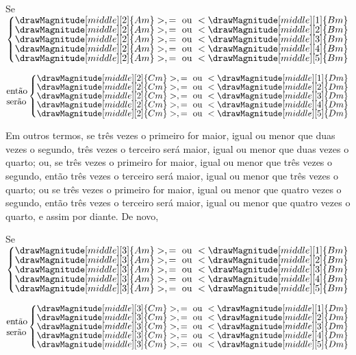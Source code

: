 \documentclass[booklanguage=brazilian]{byrnebook}
\begin{document}
\begin{center}
Se
$\left\{\vcenter{
\nointerlineskip\hbox{$\drawMagnitude[middle][2]{Am} >, = \mbox{ ou } < \drawMagnitude[middle][1]{Bm}$}
\nointerlineskip\hbox{$\drawMagnitude[middle][2]{Am} >, = \mbox{ ou } < \drawMagnitude[middle][2]{Bm}$}
\nointerlineskip\hbox{$\drawMagnitude[middle][2]{Am} >, = \mbox{ ou } < \drawMagnitude[middle][3]{Bm}$}
\nointerlineskip\hbox{$\drawMagnitude[middle][2]{Am} >, = \mbox{ ou } < \drawMagnitude[middle][4]{Bm}$}
\nointerlineskip\hbox{$\drawMagnitude[middle][2]{Am} >, = \mbox{ ou } < \drawMagnitude[middle][5]{Bm}$}
}\right.$

$\vcenter{\hbox{então}\hbox{serão}}\left\{\vcenter{
\nointerlineskip\hbox{$\drawMagnitude[middle][2]{Cm} >, = \mbox{ ou } < \drawMagnitude[middle][1]{Dm}$}
\nointerlineskip\hbox{$\drawMagnitude[middle][2]{Cm} >, = \mbox{ ou } < \drawMagnitude[middle][2]{Dm}$}
\nointerlineskip\hbox{$\drawMagnitude[middle][2]{Cm} >, = \mbox{ ou } < \drawMagnitude[middle][3]{Dm}$}
\nointerlineskip\hbox{$\drawMagnitude[middle][2]{Cm} >, = \mbox{ ou } < \drawMagnitude[middle][4]{Dm}$}
\nointerlineskip\hbox{$\drawMagnitude[middle][2]{Cm} >, = \mbox{ ou } < \drawMagnitude[middle][5]{Dm}$}
}\right.$
\end{center}

Em outros termos, se três vezes o primeiro for maior, igual ou menor que duas vezes o segundo, três vezes o terceiro será maior, igual ou menor que duas vezes o quarto; ou, se três vezes o primeiro for maior, igual ou menor que três vezes o segundo, então três vezes o terceiro será maior, igual ou menor que três vezes o quarto; ou se três vezes o primeiro for maior, igual ou menor que quatro vezes o segundo, então três vezes o terceiro será maior, igual ou menor que quatro vezes o quarto, e assim por diante. De novo,

\begin{center}
Se
$\left\{\vcenter{
\nointerlineskip\hbox{$\drawMagnitude[middle][3]{Am} >, = \mbox{ ou } < \drawMagnitude[middle][1]{Bm}$}
\nointerlineskip\hbox{$\drawMagnitude[middle][3]{Am} >, = \mbox{ ou } < \drawMagnitude[middle][2]{Bm}$}
\nointerlineskip\hbox{$\drawMagnitude[middle][3]{Am} >, = \mbox{ ou } < \drawMagnitude[middle][3]{Bm}$}
\nointerlineskip\hbox{$\drawMagnitude[middle][3]{Am} >, = \mbox{ ou } < \drawMagnitude[middle][4]{Bm}$}
\nointerlineskip\hbox{$\drawMagnitude[middle][3]{Am} >, = \mbox{ ou } < \drawMagnitude[middle][5]{Bm}$}
}\right.$

$\vcenter{\hbox{então}\hbox{serão}}\left\{\vcenter{
\nointerlineskip\hbox{$\drawMagnitude[middle][3]{Cm} >, = \mbox{ ou } < \drawMagnitude[middle][1]{Dm}$}
\nointerlineskip\hbox{$\drawMagnitude[middle][3]{Cm} >, = \mbox{ ou } < \drawMagnitude[middle][2]{Dm}$}
\nointerlineskip\hbox{$\drawMagnitude[middle][3]{Cm} >, = \mbox{ ou } < \drawMagnitude[middle][3]{Dm}$}
\nointerlineskip\hbox{$\drawMagnitude[middle][3]{Cm} >, = \mbox{ ou } < \drawMagnitude[middle][4]{Dm}$}
\nointerlineskip\hbox{$\drawMagnitude[middle][3]{Cm} >, = \mbox{ ou } < \drawMagnitude[middle][5]{Dm}$}
}\right.$
\end{center}
\end{document}
